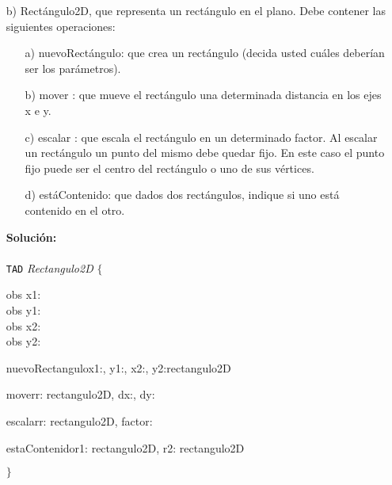 \documentclass{article}
\newenvironment{tad}[1]{
	\paragraph{} \vspace*{-4mm}
	\newcommand{\obs}[2]{\texttt{obs} ##1 : ##2}

	\vspace{1ex}
	\texttt{TAD} \textit{#1} $\{$
	\par
	\tocarEspacios
}
{

\hspace{2.5mm} $\}$
\vspace{2ex}
}
\begin{document}
\begin{itemize}
    \item[b)] Rect\'angulo2D, que representa un rect\'angulo en el plano. Debe contener las siguientes operaciones:
    \begin{itemize}
        \item[a)] nuevoRect\'angulo: que crea un rect\'angulo (decida usted cu\'ales deber\'ian ser los par\'ametros).
        \item[b)] mover : que mueve el rect\'angulo una determinada distancia en los ejes x e y.
        \item[c)] escalar : que escala el rect\'angulo en un determinado factor. Al escalar un rect\'angulo un punto del mismo debe quedar
        fijo. En este caso el punto fijo puede ser el centro del rect\'angulo o uno de sus v\'ertices.
        \item[d)] est\'aContenido: que dados dos rect\'angulos, indique si uno est\'a contenido en el otro.
    \end{itemize}
    \textbf{Soluci\'on:}
    \begin{tad}{Rectangulo2D}
        obs x1: \float \\
        obs y1: \float \\
        obs x2: \float \\
        obs y2: \float
    
    

    \begin{proc}{nuevoRectangulo}{\In x1:\float, \In y1:\float, \In x2:\float, \In y2:\float}{rectangulo2D}
    \end{proc}

    \begin{proc}{mover}{\Inout r: rectangulo2D, \In dx:\float, \In dy:\float}{}
    \end{proc}


    \begin{proc}{escalar}{\Inout r: rectangulo2D, \In factor:\float}{}
    \end{proc}

    \begin{proc}{estaContenido}{\In r1: rectangulo2D, \In r2: rectangulo2D}{\bool}
    \end{proc}

    \end{tad}
\end{itemize}
\end{document}

